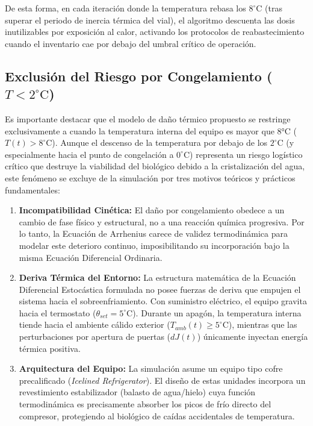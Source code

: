 \documentclass[
  spanish,
  us-letterpaper,
]{scrreprt}
\providecommand{\tightlist}{%
  \setlength{\itemsep}{0pt}\setlength{\parskip}{0pt}}
\numberwithin{equation}{section}
\theoremstyle{plain}
\theoremstyle{plain}
\theoremstyle{definition}
\theoremstyle{plain}
\theoremstyle{remark}
\begin{document}
De esta forma, en cada iteración donde la temperatura rebasa los
\(8^\circ\text{C}\) (tras superar el periodo de inercia térmica del
vial), el algoritmo descuenta las dosis inutilizables por exposición al
calor, activando los protocolos de reabastecimiento cuando el inventario
cae por debajo del umbral crítico de operación.

\subsection{\texorpdfstring{Exclusión del Riesgo por Congelamiento
(\(T < 2^\circ\text{C}\))}{Exclusión del Riesgo por Congelamiento (T \textless{} 2\^{}\textbackslash circ\textbackslash text\{C\})}}\label{exclusiuxf3n-del-riesgo-por-congelamiento-t-2circtextc}

Es importante destacar que el modelo de daño térmico propuesto se
restringe exclusivamente a cuando la temperatura interna del equipo es
mayor que 8°C (\(T(t) > 8^\circ\text{C}\)). Aunque el descenso de la
temperatura por debajo de los \(2^\circ\text{C}\) (y especialmente hacia
el punto de congelación a \(0^\circ\text{C}\)) representa un riesgo
logístico crítico que destruye la viabilidad del biológico debido a la
cristalización del agua, este fenómeno se excluye de la simulación por
tres motivos teóricos y prácticos fundamentales:

\begin{enumerate}
\def\labelenumi{\arabic{enumi}.}
\tightlist
\item
  \textbf{Incompatibilidad Cinética:} El daño por congelamiento obedece
  a un cambio de fase físico y estructural, no a una reacción química
  progresiva. Por lo tanto, la Ecuación de Arrhenius carece de validez
  termodinámica para modelar este deterioro continuo, imposibilitando su
  incorporación bajo la misma Ecuación Diferencial Ordinaria.
\item
  \textbf{Deriva Térmica del Entorno:} La estructura matemática de la
  Ecuación Diferencial Estocástica formulada no posee fuerzas de deriva
  que empujen el sistema hacia el sobreenfriamiento. Con suministro
  eléctrico, el equipo gravita hacia el termostato
  (\(\theta_{set} = 5^\circ\text{C}\)). Durante un apagón, la
  temperatura interna tiende hacia el ambiente cálido exterior
  (\(T_{amb}(t) \ge 5^\circ\text{C}\)), mientras que las perturbaciones
  por apertura de puertas (\(dJ(t)\)) únicamente inyectan energía
  térmica positiva.
\item
  \textbf{Arquitectura del Equipo:} La simulación asume un equipo tipo
  cofre precalificado (\emph{Icelined Refrigerator}). El diseño de estas
  unidades incorpora un revestimiento estabilizador (balasto de
  agua/hielo) cuya función termodinámica es precisamente absorber los
  picos de frío directo del compresor, protegiendo al biológico de
  caídas accidentales de temperatura.
\end{enumerate}
\end{document}
